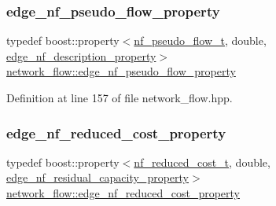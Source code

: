 \mbox{\label{classnetwork__flow_a22a6d10c77a1cfb9279a65517001e559}} 
\subsubsection{\texorpdfstring{edge\+\_\+nf\+\_\+pseudo\+\_\+flow\+\_\+property}{edge\_nf\_pseudo\_flow\_property}}
{\footnotesize\ttfamily typedef boost\+::property$<$\hyperlink{structnetwork__flow_1_1nf__pseudo__flow__t}{nf\+\_\+pseudo\+\_\+flow\+\_\+t}, double, \hyperlink{classnetwork__flow_a29cba62261c14130640a9082b9a5d70f}{edge\+\_\+nf\+\_\+description\+\_\+property}$>$ \hyperlink{classnetwork__flow_a22a6d10c77a1cfb9279a65517001e559}{network\+\_\+flow\+::edge\+\_\+nf\+\_\+pseudo\+\_\+flow\+\_\+property}\hspace{0.3cm}{\ttfamily [private]}}



Definition at line 157 of file network\+\_\+flow.\+hpp.

\mbox{\label{classnetwork__flow_ad30465332300f2ca2c25289cc0548e17}} 
\subsubsection{\texorpdfstring{edge\+\_\+nf\+\_\+reduced\+\_\+cost\+\_\+property}{edge\_nf\_reduced\_cost\_property}}
{\footnotesize\ttfamily typedef boost\+::property$<$\hyperlink{structnetwork__flow_1_1nf__reduced__cost__t}{nf\+\_\+reduced\+\_\+cost\+\_\+t}, double, \hyperlink{classnetwork__flow_a240b4140cc421faeaf98d493015fd9f3}{edge\+\_\+nf\+\_\+residual\+\_\+capacity\+\_\+property}$>$ \hyperlink{classnetwork__flow_ad30465332300f2ca2c25289cc0548e17}{network\+\_\+flow\+::edge\+\_\+nf\+\_\+reduced\+\_\+cost\+\_\+property}\hspace{0.3cm}{\ttfamily [private]}}



